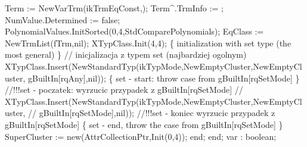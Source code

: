       Term := NewVarTrm(ikTrmEqConst,);
      Term^.TrmInfo := ;
      NumValue.Determined := false;
      PolynomialValues.InitSorted(0,4,StdComparePolynomials);
      EqClass := NewTrmList(fTrm,nil);
      XTypClass.Init(4,4);
      \{ initialization with set type (the most general) \} 
      //  inicjalizacja z typem set (najbardziej ogolnym)
      XTypClass.Insert(NewStandardTyp(ikTypMode,NewEmptyCluster,NewEmptyCluster,
                                      gBuiltIn[rqAny],nil));
      \{ set - start: throw case from gBuiltIn[rqSetMode] \}
      //!!!set - poczatek: wyrzucic przypadek z gBuiltIn[rqSetMode]
      //   XTypClass.Insert(NewStandardTyp(ikTypMode,NewEmptyCluster,NewEmptyCluster,
      //                             gBuiltIn[rqSetMode],nil));
      //!!!set - koniec wyrzucic przypadek z gBuiltIn[rqSetMode]
      \{ set - end, throw the case from gBuiltIn[rqSetMode] \}
      SuperCluster := new(AttrCollectionPtr,Init(0,4));
   end;
end;
\eatline
{}\nwendcode{}\nwdocspar
\nwenddocs{}\endmoddef\nwstartdeflinemarkup{}\nwenddeflinemarkup
var : boolean;


